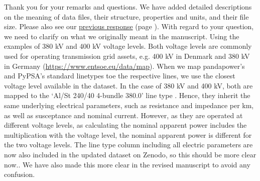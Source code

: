 \documentclass{response}
\begin{document}
\AR Thank you for your remarks and questions. We have added detailed descriptions on the meaning of data files, their structure, properties and units, and their file size. Please also see our \hyperref[ac:datarecords]{previous response} (page \pageref{ac:datarecords}). With regard to your question, we need to clarify on what we originally meant in the manuscript. Using the examples of 380 kV and 400 kV voltage levels. Both voltage levels are commonly used for operating transmission grid assets, e.g. 400 kV in Denmark \cite{akhmatovNovelHarmonicDistortion2023} and 380 kV in Germany \cite{bnetzaBestaetigungNetzentwicklungsplanStrom2024} (\href{https://www.entsoe.eu/data/map}{https://www.entsoe.eu/data/map}). When we map pandapower's \cite{thurnerPandapowerOpenSourcePython2018} and PyPSA's \cite{brownPyPSAPythonPower2018} standard linetypes toe the respective lines, we use the closest voltage level available in the dataset. In the case of 380 kV and 400 kV, both are mapped to the `Al/St 240/40 4-bundle 380.0' line type \cite{brownPyPSAPythonPower2018}. Hence, they inherit the same underlying electrical parameters, such as resistance and impedance per km, as well as susceptance and nominal current. However, as they are operated at different voltage levels, as calculating the nominal apparent power includes the multiplication with the voltage level, the nominal apparent power is different for the two voltage levels. The line type column including all electric parameters are now also included in the updated dataset on Zenodo, so this should be more clear now.\cite{xiongPrebuiltElectricityNetwork2024}. We have also made this more clear in the revised manuscript to avoid any confusion.


\end{document}
